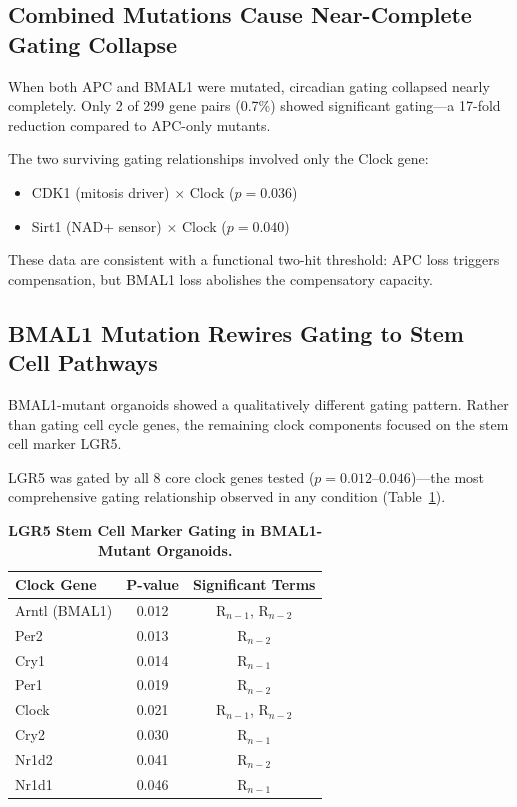 \documentclass[11pt,a4paper]{article}
\begin{document}
\subsection{Combined Mutations Cause Near-Complete Gating Collapse}

When both APC and BMAL1 were mutated, circadian gating collapsed nearly completely. Only 2 of 299 gene pairs (0.7\%) showed significant gating---a 17-fold reduction compared to APC-only mutants.

The two surviving gating relationships involved only the Clock gene:
\begin{itemize}[noitemsep]
    \item CDK1 (mitosis driver) $\times$ Clock ($p = 0.036$)
    \item Sirt1 (NAD+ sensor) $\times$ Clock ($p = 0.040$)
\end{itemize}

These data are consistent with a functional two-hit threshold: APC loss triggers compensation, but BMAL1 loss abolishes the compensatory capacity.

\subsection{BMAL1 Mutation Rewires Gating to Stem Cell Pathways}

BMAL1-mutant organoids showed a qualitatively different gating pattern. Rather than gating cell cycle genes, the remaining clock components focused on the stem cell marker LGR5.

LGR5 was gated by all 8 core clock genes tested ($p = 0.012$--$0.046$)---the most comprehensive gating relationship observed in any condition (Table~\ref{tab:lgr5}).

\begin{table}[H]
\centering
\caption{\textbf{LGR5 Stem Cell Marker Gating in BMAL1-Mutant Organoids.}}
\label{tab:lgr5}
\begin{tabular}{lcc}
\toprule
\textbf{Clock Gene} & \textbf{P-value} & \textbf{Significant Terms} \\
\midrule
Arntl (BMAL1) & 0.012 & R$_{n-1}$, R$_{n-2}$ \\
Per2 & 0.013 & R$_{n-2}$ \\
Cry1 & 0.014 & R$_{n-1}$ \\
Per1 & 0.019 & R$_{n-2}$ \\
Clock & 0.021 & R$_{n-1}$, R$_{n-2}$ \\
Cry2 & 0.030 & R$_{n-1}$ \\
Nr1d2 & 0.041 & R$_{n-2}$ \\
Nr1d1 & 0.046 & R$_{n-1}$ \\
\bottomrule
\end{tabular}
\end{table}
\end{document}
